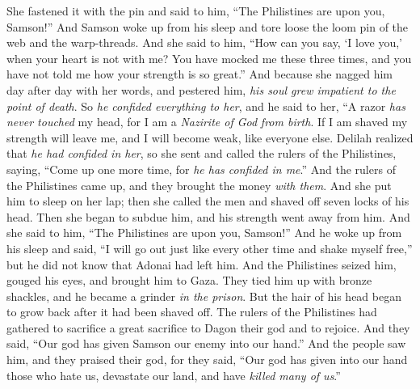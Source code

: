 \begin{biblechapter}
\verse She fastened it with the pin and said to him, “The Philistines are upon you, Samson!” And Samson woke up from his sleep and tore loose the loom pin of the web and the warp-threads.
\verse And she said to him, “How can you say, ‘I love you,’ when your heart is not with me? You have mocked me these three times, and you have not told me how your strength is so great.”
\verse And because she nagged him day after day with her words, and pestered him, \textit{his soul grew impatient to the point of death}.
\verse So \textit{he confided everything to her}, and he said to her, “A razor \textit{has never touched} my head, for I am a \textit{Nazirite of God} \textit{from birth}. If I am shaved my strength will leave me, and I will become weak, like everyone else.
\verse Delilah realized that \textit{he had confided in her}, so she sent and called the rulers of the Philistines, saying, “Come up one more time, for \textit{he has confided in me}.” And the rulers of the Philistines came up, and they brought the money \textit{with them}.
\verse And she put him to sleep on her lap; then she called the men and shaved off seven locks of his head. Then she began to subdue him, and his strength went away from him.
\verse And she said to him, “The Philistines are upon you, Samson!” And he woke up from his sleep and said, “I will go out just like every other time and shake myself free,” but he did not know that Adonai had left him.
\verse And the Philistines seized him, gouged his eyes, and brought him to Gaza. They tied him up with bronze shackles, and he became a grinder \textit{in the prison}.
\verse But the hair of his head began to grow back after it had been shaved off.
\verse The rulers of the Philistines had gathered to sacrifice a great sacrifice to Dagon their god and to rejoice. And they said, “Our god has given Samson our enemy into our hand.”
\verse And the people saw him, and they praised their god, for they said, “Our god has given into our hand those who hate us, devastate our land, and have \textit{killed many of us}.”

\end{biblechapter}
